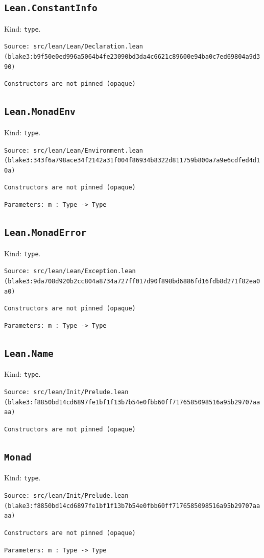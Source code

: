 \documentclass[11pt]{article}
\begin{document}
\subsection*{\texttt{Lean.ConstantInfo}}
\noindent Kind: \texttt{type}.\par
\noindent \texttt{Source: src/lean/Lean/Declaration.lean (blake3:b9f50e0ed996a5064b4fe23090bd3da4c6621c89600e94ba0c7ed69804a9d390)}\par
\noindent \texttt{Constructors are not pinned (opaque)}\par
\subsection*{\texttt{Lean.MonadEnv}}
\noindent Kind: \texttt{type}.\par
\noindent \texttt{Source: src/lean/Lean/Environment.lean (blake3:343f6a798ace34f2142a31f004f86934b8322d811759b800a7a9e6cdfed4d10a)}\par
\noindent \texttt{Constructors are not pinned (opaque)}\par
\noindent \texttt{Parameters: m : Type -> Type}\par
\subsection*{\texttt{Lean.MonadError}}
\noindent Kind: \texttt{type}.\par
\noindent \texttt{Source: src/lean/Lean/Exception.lean (blake3:9da708d920b2cc804a8734a727ff017d90f898bd6886fd16fdb8d271f82ea0a0)}\par
\noindent \texttt{Constructors are not pinned (opaque)}\par
\noindent \texttt{Parameters: m : Type -> Type}\par
\subsection*{\texttt{Lean.Name}}
\noindent Kind: \texttt{type}.\par
\noindent \texttt{Source: src/lean/Init/Prelude.lean (blake3:f8850bd14cd6897fe1bf1f13b7b54e0fbb60ff7176585098516a95b29707aaaa)}\par
\noindent \texttt{Constructors are not pinned (opaque)}\par
\subsection*{\texttt{Monad}}
\noindent Kind: \texttt{type}.\par
\noindent \texttt{Source: src/lean/Init/Prelude.lean (blake3:f8850bd14cd6897fe1bf1f13b7b54e0fbb60ff7176585098516a95b29707aaaa)}\par
\noindent \texttt{Constructors are not pinned (opaque)}\par
\noindent \texttt{Parameters: m : Type -> Type}\par
\end{document}
